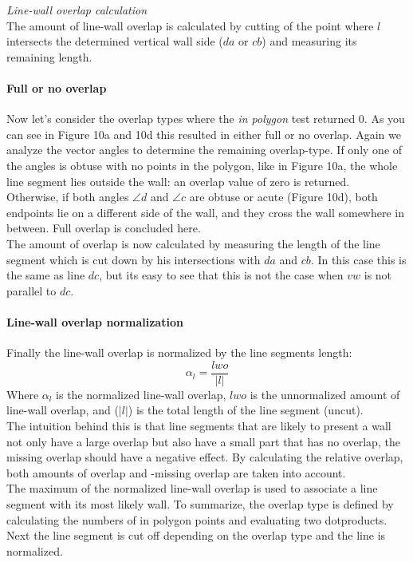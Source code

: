	\emph{Line-wall overlap calculation}\\
	The amount of line-wall overlap is calculated by cutting of the
	point where $l$ intersects the determined vertical wall side ($da$ or
	$cb$) and measuring its remaining length.\\

	\paragraph{Full or no overlap}
	Now let's consider the overlap types where the \emph{in polygon} test
	returned 0.
	As you can see in Figure 10a and 10d this resulted in either full or no overlap.
	Again we analyze the vector angles to determine the remaining overlap-type.
	If only one of the angles is obtuse with no points in the polygon, like in Figure 10a,
	the whole line segment lies outside the wall: an overlap value of zero
	is returned.\\
	Otherwise, if both angles $\angle d$ and $\angle c$ are obtuse or acute (Figure 10d),
	both endpoints lie on a different side of the wall, and they cross the wall somewhere in
	between. Full overlap is concluded here. \\
	The amount of overlap is now calculated by measuring the length
	of the line segment which is cut down by his intersections with $da$ and
	$cb$. In this case this is the same as line $dc$, but its easy to see that
	this is not the case when $vw$ is not parallel to $dc$.\\
	
	\paragraph{Line-wall overlap normalization}
	Finally the line-wall overlap is normalized by the line segments length:\\
	\begin{equation}
		\alpha_l = \frac{lwo}{|l|}
	\end{equation}
	Where $\alpha_l$ is the normalized line-wall overlap, $lwo$ is the unnormalized
	amount of line-wall overlap, and ($|l|$) is the total length of the line
	segment (uncut).\\
	The intuition behind this is that line segments that are likely to
	present a wall not only have a large overlap but also have a small part
	that has no overlap, the missing overlap should have a negative effect. By
	calculating the relative overlap, both amounts of overlap and -missing
	overlap are taken into account.\\
	The maximum of the normalized line-wall overlap is used to associate a
	line segment with its most likely wall.
	To summarize, the overlap type is defined by calculating the numbers of in
	polygon points and evaluating two dotproducts. Next the line segment is cut off
	depending on the overlap type and the line is normalized. \\
	
